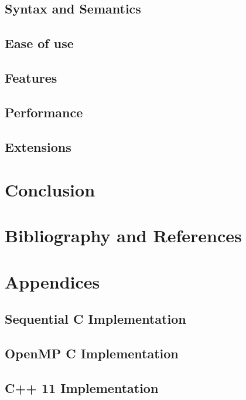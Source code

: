 \documentclass[11pt]{article} %
\begin{document}
\subsection{Syntax and Semantics}
\subsection{Ease of use}
\subsection{Features}
\subsection{Performance}
\subsection{Extensions}


\section{Conclusion}
\section{Bibliography and References}
\nocite{*}


\appendix
\pagebreak
\section{Appendices}
\subsection{Sequential C Implementation}

\pagebreak
\subsection{OpenMP C Implementation}

\pagebreak
\subsection{C++ 11 Implementation}

\pagebreak
\end{document}

